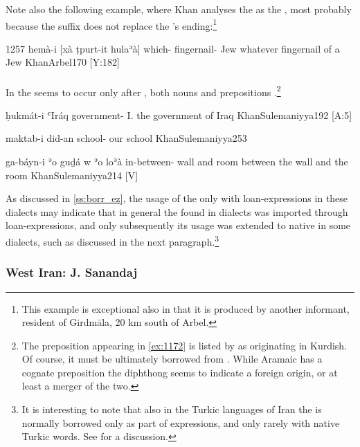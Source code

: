 Note also the following example, where Khan  analyses the  as the \ez*, most probably because the  suffix does not replace the \prim's  ending:\footnote{This example is exceptional also in that it is produced by another informant, resident of Girdmāla, 20 km south of Arbel.}


{1257}
{hemà-i [xà ṭpurt-it hulaʾà]}
{which-\ez{} \indef{} fingernail-\cst{} Jew}
{whatever fingernail of a Jew}
{KhanArbel}{170 {[Y:182]}}

\paragraph{\JSul} In \JSul the \ez* seems to occur only after , both nouns and prepositions \citep[192--193]{KhanSulemaniyya}.\footnote{The preposition  appearing in \ref{ex:1172} is listed by \citet[598]{KhanSulemaniyya} as originating in Kurdish. Of course, it must be ultimately borrowed from \Arab {}. While Aramaic has a cognate preposition  the diphthong  seems to indicate a foreign origin, or at least a merger of the two.} 

{ḥukmát-i ʿIráq}
{government-\ez{} I.}
{the government of Iraq}
{KhanSulemaniyya}{192 {[A:5]}}

{maktab-i did-an}
{school-\ez{} \pl}
{our school}
{KhanSulemaniyya}{253}

{ga-báyn-i ʾo\cb{} guḏá \cb{}w ʾo\cb{} loʾà}
{in-between-\ez{} \cb{} wall \cb{}and \cb{} room}
{between the wall and the room}
{KhanSulemaniyya}{214 {[V]}}

As discussed in \ref{ss:borr_ez}, the usage of the \ez* only with loan-expressions in these dialects may indicate that in general the \ez* found in  dialects was imported through loan-expressions, and only subsequently its usage was extended to native \prims in some dialects, such as \JSan discussed in the next paragraph.\footnote{It is interesting to note that also in the Turkic languages of Iran the  \ez* is normally borrowed only as part of  expressions, and only rarely with native Turkic words. See \citet{Kiral} for a discussion.}

\subsubsection{West Iran: J. Sanandaj} \label{ss:borr_ez_JSan}

